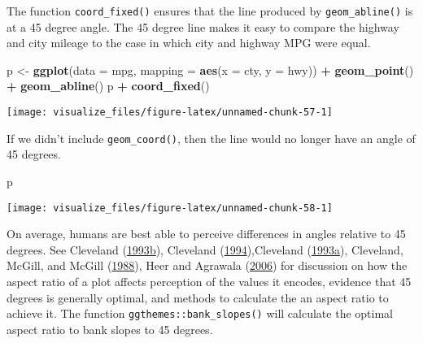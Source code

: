 \documentclass[]{book}
\newenvironment{Shaded}{\begin{snugshade}}{\end{snugshade}}
\newcommand{\DataTypeTok}[1]{\textcolor[rgb]{0.13,0.29,0.53}{#1}}
\newcommand{\KeywordTok}[1]{\textcolor[rgb]{0.13,0.29,0.53}{\textbf{#1}}}
\newcommand{\NormalTok}[1]{#1}
\newcommand{\OperatorTok}[1]{\textcolor[rgb]{0.81,0.36,0.00}{\textbf{#1}}}
\newcommand{\StringTok}[1]{\textcolor[rgb]{0.31,0.60,0.02}{#1}}
\theoremstyle{plain}
\theoremstyle{remark}
\theoremstyle{definition}
\theoremstyle{definition}
\theoremstyle{definition}
\theoremstyle{remark}
\begin{document}
The function \texttt{coord\_fixed()} ensures that the line produced by
\texttt{geom\_abline()} is at a 45 degree angle. The 45 degree line
makes it easy to compare the highway and city mileage to the case in
which city and highway MPG were equal.

\begin{Shaded}
\begin{Highlighting}[]
\NormalTok{p <-}\StringTok{ }\KeywordTok{ggplot}\NormalTok{(}\DataTypeTok{data =}\NormalTok{ mpg, }\DataTypeTok{mapping =} \KeywordTok{aes}\NormalTok{(}\DataTypeTok{x =}\NormalTok{ cty, }\DataTypeTok{y =}\NormalTok{ hwy)) }\OperatorTok{+}
\StringTok{  }\KeywordTok{geom_point}\NormalTok{() }\OperatorTok{+}
\StringTok{  }\KeywordTok{geom_abline}\NormalTok{()}
\NormalTok{p }\OperatorTok{+}\StringTok{ }\KeywordTok{coord_fixed}\NormalTok{()}
\end{Highlighting}
\end{Shaded}

\begin{center}\texttt{[image: visualize\_files/figure-latex/unnamed-chunk-57-1]} \end{center}

If we didn't include \texttt{geom\_coord()}, then the line would no
longer have an angle of 45 degrees.

\begin{Shaded}
\begin{Highlighting}[]
\NormalTok{p}
\end{Highlighting}
\end{Shaded}

\begin{center}\texttt{[image: visualize\_files/figure-latex/unnamed-chunk-58-1]} \end{center}

On average, humans are best able to perceive differences in angles
relative to 45 degrees. See Cleveland
(\protect\hyperlink{ref-Cleveland1993}{1993}\protect\hyperlink{ref-Cleveland1993}{b}),
Cleveland (\protect\hyperlink{ref-Cleveland1994}{1994}),Cleveland
(\protect\hyperlink{ref-Cleveland1993a}{1993}\protect\hyperlink{ref-Cleveland1993a}{a}),
Cleveland, McGill, and McGill
(\protect\hyperlink{ref-ClevelandMcGillMcGill1988}{1988}), Heer and
Agrawala (\protect\hyperlink{ref-HeerAgrawala2006}{2006}) for discussion
on how the aspect ratio of a plot affects perception of the values it
encodes, evidence that 45 degrees is generally optimal, and methods to
calculate the an aspect ratio to achieve it. The function
\texttt{ggthemes::bank\_slopes()} will calculate the optimal aspect
ratio to bank slopes to 45 degrees.
\end{document}
